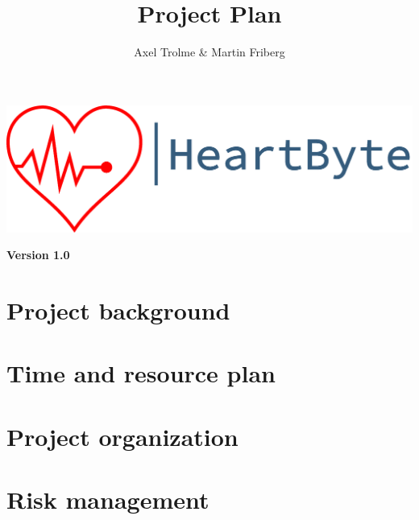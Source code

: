 \documentclass[12pt]{article}
\title{\Huge Project Plan}
\author{Axel Trolme \& Martin Friberg}
\begin{document}
\maketitle
\vfill
\includegraphics[width=\linewidth]{Pictures/logo_heartbyte_transparent_v_1_1 (1)}

\vfill
\begin{center}
    \textbf{{\large Version 1.0}}
\end{center}
\clearpage

    \section{Project background}
    
    \clearpage
    \section{Time and resource plan}
    
\clearpage
    \section{Project organization}
    
\clearpage
    \section{Risk management}
    
    
\end{document}
